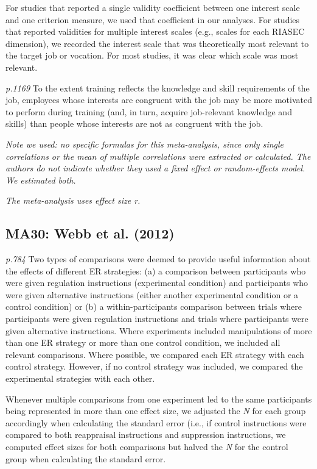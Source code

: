 \documentclass{article}
\begin{document}
For studies that reported a single validity coefficient between one interest scale and one criterion measure, we used that coefficient in our analyses. For studies that reported validities for multiple interest scales (e.g., scales for each RIASEC dimension), we recorded
the interest scale that was theoretically most relevant to the target job or vocation. For most studies, it was clear which scale was most relevant.

\textit{p.1169} To the extent training reflects the knowledge and skill requirements of the job, employees whose interests are congruent with the job may be more motivated to perform during training (and, in turn, acquire job-relevant knowledge and skills) than people whose interests are not as congruent with the job.
 
\vspace{3mm}
\textit{Note we used: no specific formulas for this meta-analysis, since only single correlations or the mean of multiple correlations were extracted or calculated. The authors do not indicate whether they used a fixed effect or random-effects model. We estimated both.}

\vspace{3mm}
\textit{The meta-analysis uses effect size r.}

\subsection*{MA30: Webb et al. (2012)} 

\textit{p.784} Two types of comparisons were deemed to provide useful information about the effects of different ER strategies: (a) a comparison between participants who were given regulation instructions (experimental condition) and participants who were given alternative instructions (either another experimental condition or a control condition) or (b) a within-participants comparison between trials where participants were given regulation instructions and trials where participants were given alternative instructions. Where experiments included manipulations of more than one ER strategy or more than one control condition, we included all relevant comparisons. Where possible, we compared each ER strategy with each control strategy. However, if no control strategy was included, we compared the experimental strategies with each other.

Whenever multiple comparisons from one experiment led to the same participants being represented in more than one effect size, we adjusted the \textit{N} for each group accordingly when calculating the standard error (i.e., if control instructions were compared to both reappraisal instructions and suppression instructions, we computed effect sizes for both comparisons but halved the \textit{N} for the control group when calculating the standard error. 
\end{document}
